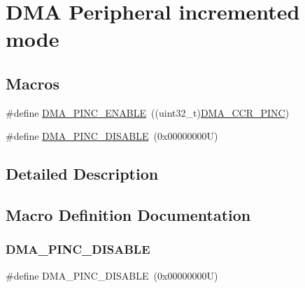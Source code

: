 \hypertarget{group___d_m_a___peripheral__incremented__mode}{}\section{D\+MA Peripheral incremented mode}
\label{group___d_m_a___peripheral__incremented__mode}
\subsection*{Macros}
\begin{DoxyCompactItemize}
\item 
\#define \hyperlink{group___d_m_a___peripheral__incremented__mode_gab6d84e5805302516d26c06fb4497a346}{D\+M\+A\+\_\+\+P\+I\+N\+C\+\_\+\+E\+N\+A\+B\+LE}~((uint32\+\_\+t)\hyperlink{group___peripheral___registers___bits___definition_ga028cb96357bd24868a74ee1134a35b7e}{D\+M\+A\+\_\+\+C\+C\+R\+\_\+\+P\+I\+NC})
\item 
\#define \hyperlink{group___d_m_a___peripheral__incremented__mode_ga63e2aff2973d1a8f01d5d7b6e4894f39}{D\+M\+A\+\_\+\+P\+I\+N\+C\+\_\+\+D\+I\+S\+A\+B\+LE}~(0x00000000\+U)
\end{DoxyCompactItemize}


\subsection{Detailed Description}


\subsection{Macro Definition Documentation}
\mbox{\label{group___d_m_a___peripheral__incremented__mode_ga63e2aff2973d1a8f01d5d7b6e4894f39}} 
\subsubsection{\texorpdfstring{D\+M\+A\+\_\+\+P\+I\+N\+C\+\_\+\+D\+I\+S\+A\+B\+LE}{DMA\_PINC\_DISABLE}}
{\footnotesize\ttfamily \#define D\+M\+A\+\_\+\+P\+I\+N\+C\+\_\+\+D\+I\+S\+A\+B\+LE~(0x00000000\+U)}

